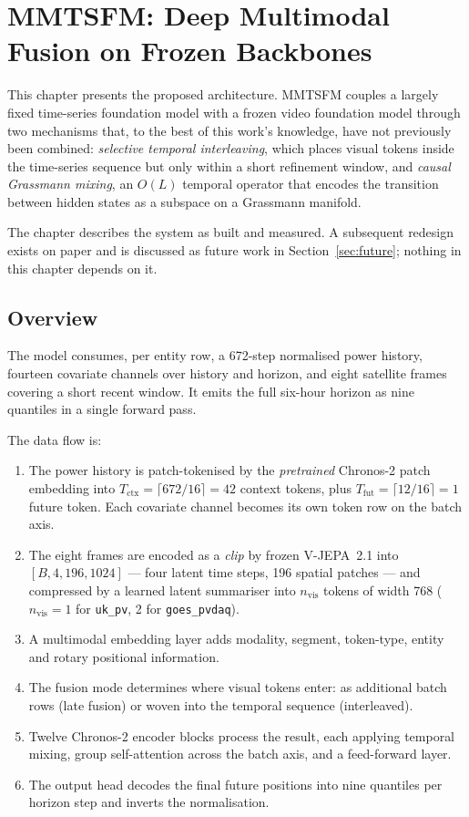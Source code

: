 \chapter{MMTSFM: Deep Multimodal Fusion on Frozen Backbones}
\label{cha:method}

This chapter presents the proposed architecture. MMTSFM couples a largely fixed time-series
foundation model with a frozen video foundation model through two mechanisms that, to the
best of this work's knowledge, have not previously been combined: \emph{selective temporal
interleaving}, which places visual tokens inside the time-series sequence but only within a
short refinement window, and \emph{causal Grassmann mixing}, an $O(L)$ temporal operator
that encodes the transition between hidden states as a subspace on a Grassmann manifold.

The chapter describes the system as built and measured. A subsequent redesign exists on
paper and is discussed as future work in Section~\ref{sec:future}; nothing in this chapter
depends on it.

\section{Overview}
\label{sec:overview}

The model consumes, per entity row, a 672-step normalised power history, fourteen covariate
channels over history and horizon, and eight satellite frames covering a short recent
window. It emits the full six-hour horizon as nine quantiles in a single forward pass.

The data flow is:

\begin{enumerate}
  \item The power history is patch-tokenised by the \emph{pretrained} Chronos-2 patch
    embedding into $T_{\text{ctx}} = \lceil 672/16 \rceil = 42$ context tokens, plus
    $T_{\text{fut}} = \lceil 12/16 \rceil = 1$ future token. Each covariate channel becomes
    its own token row on the batch axis.
  \item The eight frames are encoded as a \emph{clip} by frozen V-JEPA~2.1 into
    $[B, 4, 196, 1024]$ --- four latent time steps, 196 spatial patches --- and compressed
    by a learned latent summariser into $n_{\text{vis}}$ tokens of width 768
    ($n_{\text{vis}}=1$ for \texttt{uk\_pv}, 2 for \texttt{goes\_pvdaq}).
  \item A multimodal embedding layer adds modality, segment, token-type, entity and rotary
    positional information.
  \item The fusion mode determines where visual tokens enter: as additional batch rows
    (late fusion) or woven into the temporal sequence (interleaved).
  \item Twelve Chronos-2 encoder blocks process the result, each applying temporal mixing,
    group self-attention across the batch axis, and a feed-forward layer.
  \item The output head decodes the final future positions into nine quantiles per horizon
    step and inverts the normalisation.
\end{enumerate}

